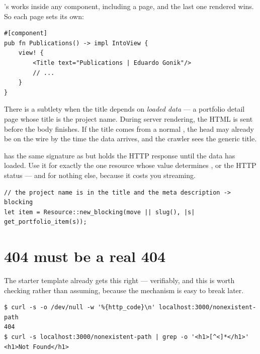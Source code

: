 's  works inside any component, including a page, and the last one
rendered wins. So each page sets its own:

\begin{lstlisting}[style=rs]
#[component]
pub fn Publications() -> impl IntoView {
    view! {
        <Title text="Publications | Eduardo Gonik"/>
        // ...
    }
}
\end{lstlisting}

There is a subtlety when the title depends on \emph{loaded data} --- a portfolio detail page whose
title is the project name. During server rendering, the HTML  is sent before the body
finishes. If the title comes from a normal , the head may already be on the wire by
the time the data arrives, and the crawler sees the generic title.

\begin{pattern}
 has the same signature as  but holds the HTTP
response until the data has loaded. Use it for exactly the one resource whose value determines
,  or the HTTP status --- and for nothing else, because it costs you
streaming.
\begin{lstlisting}[style=rs]
// the project name is in the title and the meta description -> blocking
let item = Resource::new_blocking(move || slug(), |s| get_portfolio_item(s));
\end{lstlisting}
\end{pattern}

\section{404 must be a real 404}

The starter template already gets this right --- verifiably, and this is worth checking rather than
assuming, because the mechanism is easy to break later.

\begin{verified}
\begin{lstlisting}[style=out]
$ curl -s -o /dev/null -w '%{http_code}\n' localhost:3000/nonexistent-path
404
$ curl -s localhost:3000/nonexistent-path | grep -o '<h1>[^<]*</h1>'
<h1>Not Found</h1>
\end{lstlisting}
\end{verified}

